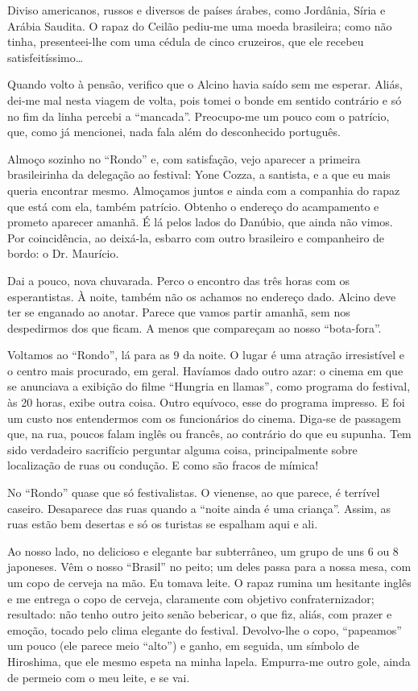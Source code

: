 Diviso americanos, russos e diversos de países árabes, como Jordânia, Síria e Arábia Saudita. O rapaz do Ceilão pediu-me uma moeda brasileira; como não tinha, presenteei-lhe com uma cédula de cinco cruzeiros, que ele recebeu satisfeitíssimo\ldots

Quando volto à pensão, verifico que o Alcino havia saído sem me esperar. Aliás, dei-me mal nesta viagem de volta, pois tomei o bonde em sentido contrário e só no fim da linha percebi a ``mancada''. Preocupo-me um pouco com o patrício, que, como já mencionei, nada fala além do desconhecido português.

Almoço sozinho no ``Rondo'' e, com satisfação, vejo aparecer a primeira brasileirinha da delegação ao festival: Yone Cozza, a santista, e a que eu mais queria encontrar mesmo. Almoçamos juntos e ainda com a companhia do rapaz que está com ela, também patrício. Obtenho o endereço do acampamento e prometo aparecer amanhã. É lá pelos lados do Danúbio, que ainda não vimos. Por coincidência, ao deixá-la, esbarro com outro brasileiro e companheiro de bordo: o Dr. Maurício.

Dai a pouco, nova chuvarada. Perco o encontro das três horas com os esperantistas. À noite, também não os achamos no endereço dado. Alcino deve ter se enganado ao anotar. Parece que vamos partir amanhã, sem nos despedirmos dos que ficam. A menos que compareçam ao nosso ``bota-fora''.

Voltamos ao ``Rondo'', lá para as 9 da noite. O lugar é uma atração irresistível e o centro mais procurado, em geral. Havíamos dado outro azar: o cinema em que se anunciava a exibição do filme ``Hungria en llamas'', como programa do festival, às 20 horas, exibe outra coisa. Outro equívoco, esse do programa impresso. E foi um custo nos entendermos com os funcionários do cinema. Diga-se de passagem que, na rua, poucos falam inglês ou francês, ao contrário do que eu supunha. Tem sido verdadeiro sacrifício perguntar alguma coisa, principalmente sobre localização de ruas ou condução. E como são fracos de mímica!

No ``Rondo'' quase que só festivalistas. O vienense, ao que parece, é terrível caseiro. Desaparece das ruas quando a ``noite ainda é uma criança''. Assim, as ruas estão bem desertas e só os turistas se espalham aqui e ali.

Ao nosso lado, no delicioso e elegante bar subterrâneo, um grupo de uns 6 ou 8 japoneses. Vêm o nosso ``Brasil'' no peito; um deles passa para a nossa mesa, com um copo de cerveja na mão. Eu tomava leite. O rapaz rumina um hesitante inglês e me entrega o copo de cerveja, claramente com objetivo confraternizador; resultado: não tenho outro jeito senão bebericar, o que fiz, aliás, com prazer e emoção, tocado pelo clima elegante do festival. Devolvo-lhe o copo, ``papeamos'' um pouco (ele parece meio ``alto'') e ganho, em seguida, um símbolo de Hiroshima, que ele mesmo espeta na minha lapela. Empurra-me outro gole, ainda de permeio com o meu leite, e se vai.

